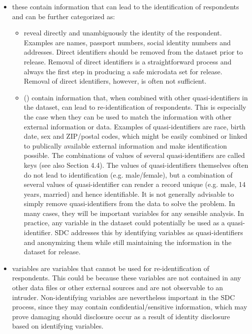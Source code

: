 \documentclass[letterpaper,10pt,english]{sphinxmanual}
\begin{document}
\begin{itemize}
\item {} 
 these contain information that can lead to
the identification of respondents and can be further categorized as:
\begin{itemize}
\item {} 
 reveal directly and unambiguously the
identity of the respondent. Examples are names, passport numbers,
social identity numbers and addresses. Direct identifiers should
be removed from the dataset prior to release. Removal of direct
identifiers is a straightforward process and always the first step
in producing a safe microdata set for release. Removal of direct
identifiers, however, is often not sufficient.

\item {} 
 () contain information
that, when combined with other quasi-identifiers in the dataset,
can lead to re-identification of respondents. This is especially
the case when they can be used to match the information with other
external information or data. Examples of quasi-identifiers are
race, birth date, sex and ZIP/postal codes, which might be easily
combined or linked to publically available external information
and make identification possible. The combinations of values of
several quasi-identifiers are called keys (see also Section 4.4).
The values of quasi-identifiers themselves often do not lead to
identification (e.g. male/female), but a combination of several
values of quasi-identifier can render a record unique (e.g. male,
14 years, married) and hence identifiable. It is not generally
advisable to simply remove quasi-identifiers from the data to
solve the problem. In many cases, they will be important variables
for any sensible analysis. In practice, any variable in the
dataset could potentially be used as a quasi-identifier. SDC
addresses this by identifying variables as quasi-identifiers and
anonymizing them while still maintaining the information in the
dataset for release.

\end{itemize}

\item {} 
 variables are variables that cannot be used for
re-identification of respondents. This could be because these
variables are not contained in any other data files or other external
sources and are not observable to an intruder. Non-identifying
variables are nevertheless important in the SDC process, since they
may contain confidential/sensitive information, which may prove
damaging should disclosure occur as a result of identity disclosure
based on identifying variables.


\end{itemize}
\end{document}
